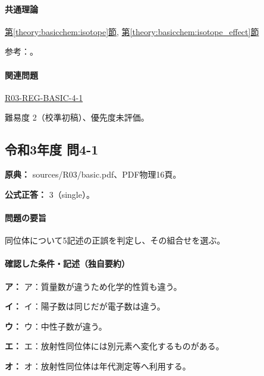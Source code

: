 \paragraph{共通理論} \hyperref[theory:basicchem:isotope]{第\ref*{theory:basicchem:isotope}節}, \hyperref[theory:basicchem:isotope_effect]{第\ref*{theory:basicchem:isotope_effect}節}

\par 参考：\cite{iupac_isotopes,iupac_isotope_effect}。

\paragraph{関連問題} \hyperref[q:r03-reg-basic-4-1]{R03-REG-BASIC-4-1}

\par 難易度 2（校準初稿）、優先度未評価。

\subsection{令和3年度 問4-1}
\label{q:r03-reg-basic-4-1}

\noindent\textbf{原典：} sources/R03/basic.pdf、PDF物理16頁。

\textbf{公式正答：} 3（single）。

\paragraph{問題の要旨} 同位体について5記述の正誤を判定し、その組合せを選ぶ。

\paragraph{確認した条件・記述（独自要約）}\mbox{}\par

\noindent\textbf{ア：} ア：質量数が違うため化学的性質も違う。\par

\noindent\textbf{イ：} イ：陽子数は同じだが電子数は違う。\par

\noindent\textbf{ウ：} ウ：中性子数が違う。\par

\noindent\textbf{エ：} エ：放射性同位体には別元素へ変化するものがある。\par

\noindent\textbf{オ：} オ：放射性同位体は年代測定等へ利用する。\par

